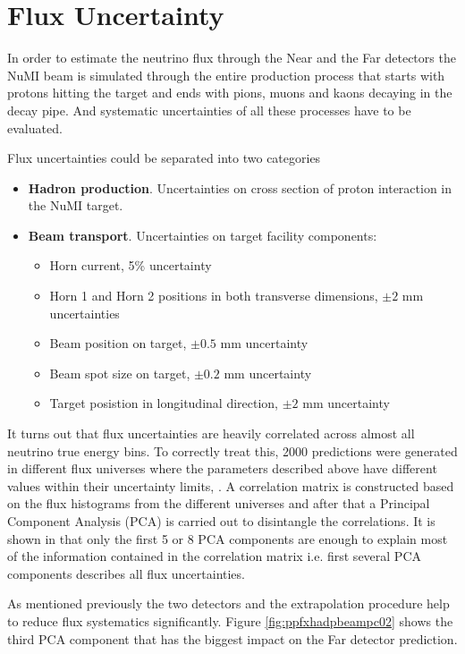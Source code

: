 \section{Flux Uncertainty}
In order to estimate the neutrino flux through the Near and the Far detectors the NuMI beam is simulated through the 
entire production process that starts with protons hitting the target and ends with pions, muons and kaons decaying in 
the decay pipe. And systematic uncertainties of all these processes have to be evaluated.

Flux uncertainties could be separated into two categories 
\begin{itemize}
\item \textbf{Hadron production}. Uncertainties on cross section of proton interaction in the NuMI target. 
\item \textbf{Beam transport}. Uncertainties on target facility components:
\begin{itemize}
	\item Horn current, 5\% uncertainty
	\item Horn 1 and Horn 2 positions in both transverse dimensions,  $\pm2$ mm uncertainties
	\item Beam position on target, $\pm0.5$ mm uncertainty
        \item Beam spot size on target, $\pm0.2$ mm uncertainty
	\item Target posistion in longitudinal direction, $\pm2$ mm uncertainty
\end{itemize} 
\end{itemize}

It turns out that flux uncertainties are heavily correlated across almost all neutrino true energy bins. To correctly treat this,
2000 predictions were generated in different flux universes where the parameters described above have different values within their
uncertainty limits, \cite{fluxPCA_technote}. A correlation matrix is constructed based on the flux histograms from the different universes 
and after that a Principal Component Analysis (PCA) is carried out to disintangle the correlations. It is shown in 
\cite{fluxPCA_technote} that only the first 5 or 8 PCA components are enough to explain most of the information contained in the 
correlation matrix i.e. first several PCA components describes all flux uncertainties. 

As mentioned previously the two detectors and the extrapolation procedure help to reduce flux systematics significantly. Figure 
\ref{fig:ppfxhadpbeampc02} shows the third PCA component that has the biggest impact on the Far detector prediction.

